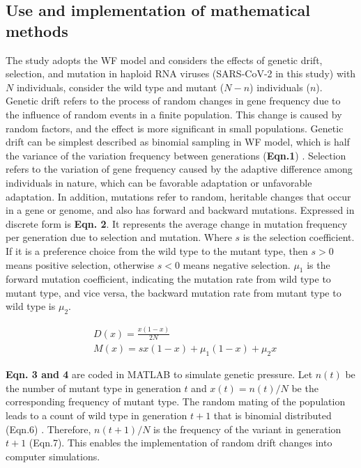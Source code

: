 \documentclass[12pt]{article}
\begin{document}
\subsection{Use and implementation of mathematical methods}
The study adopts the WF model and considers the effects of genetic drift, selection, and mutation in haploid RNA viruses (SARS-CoV-2 in this study) with $N$ individuals, consider the wild type and mutant ($N-n$) individuals ($n$). Genetic drift refers to the process of random changes in gene frequency due to the influence of random events in a finite population. This change is caused by random factors, and the effect is more significant in small populations. Genetic drift can be simplest described as binomial sampling in WF model, which is half the variance of the variation frequency between generations (\textbf{Eqn.1}) \citep{kimura1983neutral}. Selection refers to the variation of gene frequency caused by the adaptive difference among individuals in nature, which can be favorable adaptation or unfavorable adaptation. In addition, mutations refer to random, heritable changes that occur in a gene or genome, and also has forward and backward mutations. Expressed in discrete form is \textbf{Eqn. 2}. It represents the average change in mutation frequency per generation due to selection and mutation. Where $s$ is the selection coefficient. If it is a preference choice from the wild type to the mutant type, then $s>0$ means positive selection, otherwise $s<0$ means negative selection. $\mu_1$ is the forward mutation coefficient, indicating the mutation rate from wild type to mutant type, and vice versa, the backward mutation rate from mutant type to wild type is $\mu_2$. 

\begin{align}
  &  D(x) = \frac{x(1-x)}{2N}\\
  &  M(x) = sx(1-x) + \mu_1(1-x) + \mu_2 x 
\end{align}

    \textbf{Eqn. 3 and 4} are coded in MATLAB to simulate genetic pressure. Let $n(t)$ be the number of mutant type in generation $t$ and $x(t)={n(t)}/{N}$ be the corresponding frequency of mutant type. The random mating of the population leads to a count of wild type in generation $t+1$ that is binomial distributed (Eqn.6) \citep{wright1931evolution, crow1970introduction, fisher1999genetical, ewens2004mathematical}. Therefore, $n(t+1)/N$ is the frequency of the variant in generation $t+1$ (Eqn.7). This enables the implementation of random drift changes into computer simulations.
\end{document}
